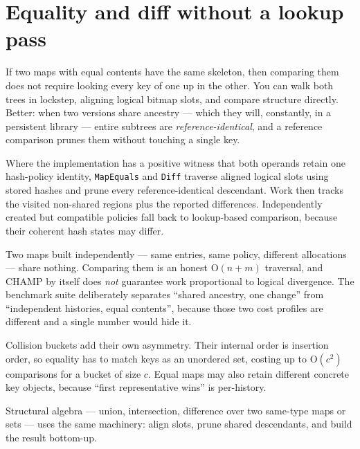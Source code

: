 \documentclass[11pt,twoside,openright]{book}
\newcommand{\code}[1]{\texorpdfstring{\textcolor{d7ink}{\texttt{#1}}}{#1}}
\newcommand{\bigoh}[1]{$\mathrm{O}(#1)$}
\begin{document}
\section{Equality and diff without a lookup pass}

If two maps with equal contents have the same skeleton, then comparing them does
not require looking every key of one up in the other. You can walk both trees in
lockstep, aligning logical bitmap slots, and compare structure directly.
Better: when two versions share ancestry --- which they will, constantly, in a
persistent library --- entire subtrees are \emph{reference-identical}, and a
reference comparison prunes them without touching a single key.

\begin{contractbox}
Where the implementation has a positive witness that both operands retain one
hash-policy identity, \code{MapEquals} and \code{Diff} traverse aligned logical
slots using stored hashes and prune every reference-identical descendant. Work
then tracks the visited non-shared regions plus the reported differences.
Independently created but compatible policies fall back to lookup-based
comparison, because their coherent hash states may differ.
\end{contractbox}

\begin{caveatbox}
Two maps built independently --- same entries, same policy, different
allocations --- share nothing. Comparing them is an honest \bigoh{n+m}
traversal, and CHAMP by itself does \emph{not} guarantee work proportional to
logical divergence. The benchmark suite deliberately separates
``shared ancestry, one change'' from ``independent histories, equal contents'',
because those two cost profiles are different and a single number would hide it.

Collision buckets add their own asymmetry. Their internal order is insertion
order, so equality has to match keys as an unordered set, costing up to
\bigoh{c^2} comparisons for a bucket of size $c$. Equal maps may also retain
different concrete key objects, because ``first representative wins'' is
per-history.
\end{caveatbox}

Structural algebra --- union, intersection, difference over two same-type maps or
sets --- uses the same machinery: align slots, prune shared descendants, and
build the result bottom-up.
\end{document}
